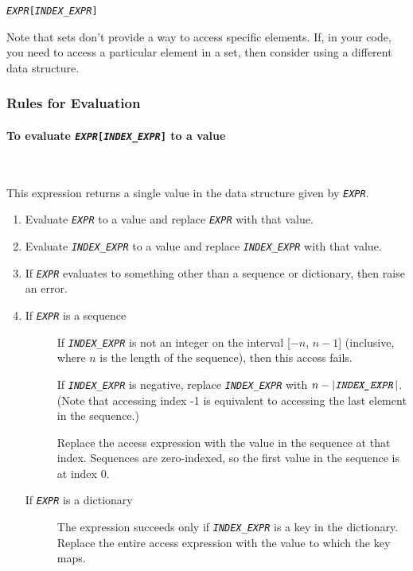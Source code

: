 \documentclass{article}
\newcommand{\expr}[1]{\texttt{#1}}
\newcommand{\mvar}[1]{\expr{\emph{\uppercase{#1}}}}
\newcommand{\myparagraph}[1]{\paragraph{#1} \ifhevea\else \strut \\ \strut \fi}
\begin{document}
  \begin{description}
    \item \expr{\mvar{EXPR}[\mvar{INDEX\_EXPR}]}
  \end{description}

  Note that sets don't provide a way to access specific elements. If, in your code, you need to access a particular element in a set, then consider using a different data structure.

\subsubsection{Rules for Evaluation}

  \myparagraph{To evaluate \expr{\mvar{EXPR}[\mvar{INDEX\_EXPR}]} to a value}
  This expression returns a single value in the data structure given by \mvar{EXPR}.
  \begin{enumerate}
    \item
    Evaluate \mvar{EXPR} to a value and replace \mvar{EXPR} with that value.

    \item
    Evaluate \mvar{INDEX\_EXPR} to a value and replace \mvar{INDEX\_EXPR} with that value.

    \item
    If \mvar{EXPR} evaluates to something other than a sequence or dictionary, then raise an error.

    \item
    \begin{description}
      \item[If \mvar{EXPR} is a sequence] If \mvar{INDEX\_EXPR} is not an integer on the interval [$-n$, $n-1$] (inclusive, where $n$ is the length of the sequence), then this access fails.

      If \mvar{INDEX\_EXPR} is negative, replace \mvar{INDEX\_EXPR} with
      $n - \left|\mvar{INDEX\_EXPR}\right|$.  (Note that accessing index -1 is equivalent to accessing the last element in the sequence.)

      Replace the access expression with the value in the sequence at that index. Sequences are zero-indexed, so the first value in the sequence is at index 0.

      \item[If \mvar{EXPR} is a dictionary] The expression succeeds only if \mvar{INDEX\_EXPR} is a key in the dictionary. Replace the entire access expression with the value to which the key maps.
    \end{description}
  \end{enumerate}
\end{document}
